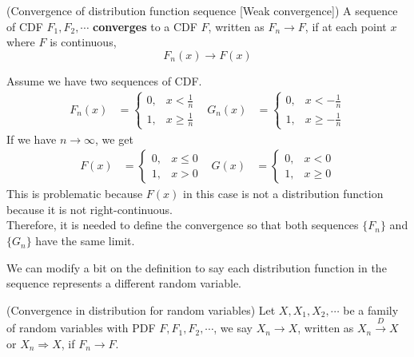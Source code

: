 \documentclass{huhtakm-template-book}
\begin{document}
    \begin{defn}(Convergence of distribution function sequence [Weak convergence])
        A sequence of CDF 
        $F_{1},F_{2},\cdots$ \textbf{converges} to a CDF $F$, written as $F_{n}\to F$, if at each point $x$ where $F$ is continuous,
        \begin{equation*}
            F_{n}(x)\to F(x)
        \end{equation*}
    \end{defn}
    \begin{eg}
        Assume we have two sequences of CDF.
        \begin{align*}
            F_{n}(x)&=\begin{cases}
                0, &x<\frac{1}{n}\\
                1, & x\geq\frac{1}{n}
            \end{cases} & G_{n}(x)&=\begin{cases}
                0, &x<-\frac{1}{n}\\
                1, & x\geq-\frac{1}{n}
            \end{cases}
        \end{align*}
        If we have $n\to\infty$, we get
        \begin{align*}
            F(x)&=\begin{cases}
                0, &x\leq 0\\
                1, &x>0
            \end{cases} & G(x)&=\begin{cases}
                0, &x<0\\
                1, &x\geq 0
            \end{cases}
        \end{align*}
        This is problematic because $F(x)$ in this case is not a distribution function because it is not right-continuous.\\
        Therefore, it is needed to define the convergence so that both sequences $\{F_{n}\}$ and $\{G_{n}\}$ have the same limit.
    \end{eg}
    We can modify a bit on the definition to say each distribution function in the sequence represents a different random variable.
    \begin{defn}(Convergence in distribution for random variables)
        Let $X,X_{1},X_{2},\cdots$ be a family of random variables with PDF $F,F_{1},F_{2},\cdots$, we say $X_{n}\to X$, written as $X_{n}\xrightarrow{D}X$ or $X_{n}\Rightarrow X$, if $F_{n}\to F$.
    \end{defn}
\end{document}
